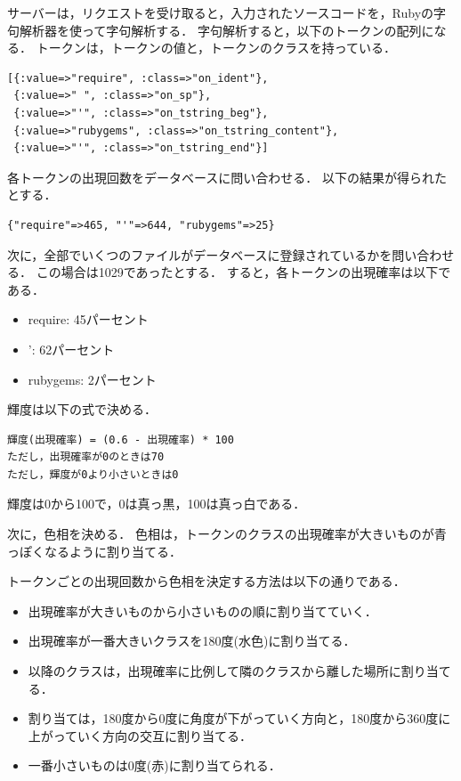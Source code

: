 \documentclass{cs-thesis}
\begin{document}
サーバーは，リクエストを受け取ると，入力されたソースコードを，Rubyの字句解析器を使って字句解析する．
字句解析すると，以下のトークンの配列になる．
トークンは，トークンの値と，トークンのクラスを持っている．

\begin{framed}
\begin{verbatim}
[{:value=>"require", :class=>"on_ident"},
 {:value=>" ", :class=>"on_sp"},
 {:value=>"'", :class=>"on_tstring_beg"},
 {:value=>"rubygems", :class=>"on_tstring_content"},
 {:value=>"'", :class=>"on_tstring_end"}]
\end{verbatim}
\end{framed}

各トークンの出現回数をデータベースに問い合わせる．
以下の結果が得られたとする．
\begin{framed}
\begin{verbatim}
{"require"=>465, "'"=>644, "rubygems"=>25}
\end{verbatim}
\end{framed}

次に，全部でいくつのファイルがデータベースに登録されているかを問い合わせる．
この場合は1029であったとする．
すると，各トークンの出現確率は以下である．

\begin{itemize}
 \item require: 45パーセント
 \item ': 62パーセント
 \item rubygems: 2パーセント
\end{itemize}

輝度は以下の式で決める．

\begin{framed}
\begin{verbatim}
輝度(出現確率) = (0.6 - 出現確率) * 100
ただし，出現確率が0のときは70
ただし，輝度が0より小さいときは0
\end{verbatim}
\end{framed}

輝度は0から100で，0は真っ黒，100は真っ白である．

次に，色相を決める．
色相は，トークンのクラスの出現確率が大きいものが青っぽくなるように割り当てる．

トークンごとの出現回数から色相を決定する方法は以下の通りである．
\begin{itemize}
 \item 出現確率が大きいものから小さいものの順に割り当てていく．
 \item 出現確率が一番大きいクラスを180度(水色)に割り当てる．
 \item 以降のクラスは，出現確率に比例して隣のクラスから離した場所に割り当てる．
 \item 割り当ては，180度から0度に角度が下がっていく方向と，180度から360度に上がっていく方向の交互に割り当てる．
 \item 一番小さいものは0度(赤)に割り当てられる．
\end{itemize}
\end{document}

